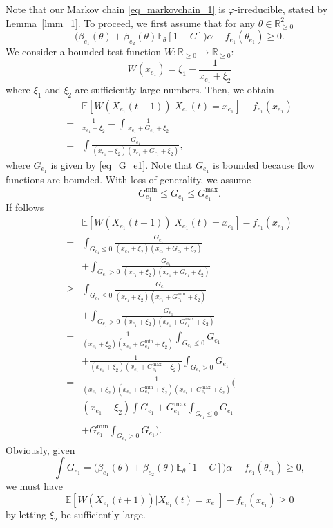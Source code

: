 Note that our Markov chain \eqref{eq_markovchain_1} is $\varphi$-irreducible, stated by Lemma~\ref{lmm_1}. To proceed, we first assume that for any $\theta\in\mathbb{R}_{\geq0}^2$
\begin{equation}
    \Big(\beta_{e_1}(\theta) + \beta_{e_2}(\theta)\mathbb{E}_\theta[1-C]\Big)\alpha -f_{e_1}(\theta_{e_1}) \geq 0. \label{eq_pf_thm1_transience}
\end{equation}
We consider a bounded test function $W:\mathbb{R}_{\geq0}\to\mathbb{R}_{\geq0}$:
\begin{equation}
    W(x_{e_1}) = \xi_1 - \frac{1}{x_{e_1} + \xi_2}
\end{equation}
where $\xi_1$ and $\xi_2$ are sufficiently large numbers.
Then, we obtain
\begin{align*}
     &\mathbb{E}[W(X_{e_1}(t+1))|X_{e_1}(t)=x_{e_1}] - f_{e_1}(x_{e_1}) \\
    =& \frac{1}{x_{e_1}+\xi_2} - \int \frac{1}{x_{e_1}+G_{e_1}+\xi_2} \\
    =& \int\frac{G_{e_1}}{(x_{e_1}+\xi_2)(x_{e_1}+G_{e_1}+\xi_2)},
\end{align*}
where $G_{e_1}$ is given by \eqref{eq_G_e1}. Note that $G_{e_1}$ is bounded because flow functions are bounded. With loss of generality, we assume 
\begin{equation*}
    G_{e_1}^{\mathrm{min}} \leq G_{e_1} \leq G_{e_1}^{\mathrm{max}}.
\end{equation*}
If follows
\begin{align*}
     &\mathbb{E}[W(X_{e_1}(t+1))|X_{e_1}(t)=x_{e_1}] - f_{e_1}(x_{e_1}) \\
    =& \int_{G_{e_1}\leq0}\frac{G_{e_1}}{(x_{e_1}+\xi_2)(x_{e_1}+G_{e_1}+\xi_2)} \\
     & + \int_{G_{e_1}>0}\frac{G_{e_1}}{(x_{e_1}+\xi_2)(x_{e_1}+G_{e_1}+\xi_2)} \\
    \geq & \int_{G_{e_1}\leq0}\frac{G_{e_1}}{(x_{e_1}+\xi_2)(x_{e_1}+G_{e_1}^{\mathrm{min}}+\xi_2)} \\
     & + \int_{G_{e_1}>0}\frac{G_{e_1}}{(x_{e_1}+\xi_2)(x_{e_1}+G_{e_1}^{\mathrm{max}}+\xi_2)} \\
     =& \frac{1}{(x_{e_1}+\xi_2)(x_{e_1}+G_{e_1}^{\mathrm{min}}+\xi_2)}\int_{G_{e_1}\leq0} G_{e_1} \\
     &+ \frac{1}{(x_{e_1}+\xi_2)(x_{e_1}+G_{e_1}^{\mathrm{max}}+\xi_2)}\int_{G_{e_1}>0} G_{e_1} \\
     =& \frac{1}{(x_{e_1}+\xi_2)(x_{e_1}+G_{e_1}^{\mathrm{min}}+\xi_2)(x_{e_1}+G_{e_1}^{\mathrm{max}}+\xi_2)}\Big(\\
     &(x_{e_1}+\xi_2)\int G_{e_1}+ G_{e_1}^{\max}\int_{G_{e_1}\leq0}G_{e_1} \\
     & + G_{e_1}^{\min}\int_{G_{e_1}>0}G_{e_1} \Big).
\end{align*}
Obviously, given 
$$\int G_{e_1} = \Big(\beta_{e_1}(\theta) + \beta_{e_2}(\theta)\mathbb{E}_\theta[1-C]\Big)\alpha -f_{e_1}(\theta_{e_1}) \geq 0,$$
we must have 
$$\mathbb{E}[W(X_{e_1}(t+1))|X_{e_1}(t)=x_{e_1}] - f_{e_1}(x_{e_1})\geq0$$
by letting $\xi_2$ be sufficiently large.

